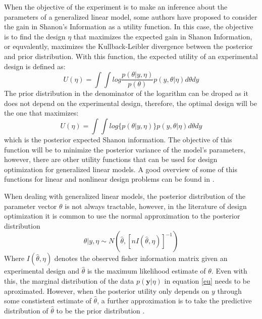\documentclass[preprint,review,12pt]{elsarticle}
\begin{document}
When the objective of the experiment is to make an inference about the parameters of a generalized linear model, some authors \citep[e.g.][]{Ber1979} have proposed to consider the gain in Shanon's Information as a utility function. In this case, the objective is to find the design $\eta$ that maximizes the expected gain in Shanon Information, or equvalently, maximizes the Kullback-Leibler divergence between the posterior and prior distribution. With this function, the expected utility of an experimental design is defined as:
\begin{equation}
U(\eta)=\int \int log\frac{p(\theta|y,\eta)}{p(\theta)} p(y,\theta |\eta) d\theta dy
\label{klu}
\end{equation}
The prior distribution in the denominator of the logarithm can be droped as it does not depend on the experimental design, therefore, the optimal design will be the one that maximizes:
\begin{equation}
U(\eta)=\int \int log \{p(\theta|y,\eta)\} p(y,\theta |\eta) d\theta dy
\label{egShanon}
\end{equation}
which is the posterior expected Shanon information. The objective of this function will be to minimize the posterior variance of the model's parameters, however, there are other utility functions that can be used for design optimization for generalized linear models. A good overview of some of this functions for linear and nonlinear design problems can be found in \citet{ChalonerVerdinelli1995}. 

When dealing with generalized linear models, the posterior distribution of the parameter vector $\theta$ is not always tractable, however, in the literature of design optimization it is common to use the normal approximation to the posterior distribution
\begin{equation}
\theta|y,\eta \sim N\left(\hat{\theta},[nI(\hat{\theta},\eta)]^{-1}\right)
\label{Naprox}
\end{equation}
Where $I(\hat{\theta},\eta)$ denotes the observed fisher information matrix given an experimental design and $\hat{\theta}$ is the maximum likelihood estimate of $\theta$. Even with this, the marginal distribution of the data $p(\mathbf{y}|\eta)$ in equation \ref{eu} needs to be aproximated. However, when the posterior utility only depends on $y$ through some constistent estimate of $\hat{\theta}$, a further approximation is to take the predictive distribution of  $\hat{\theta}$ to be the prior distribution \cite{chalar1989}.
\end{document}
